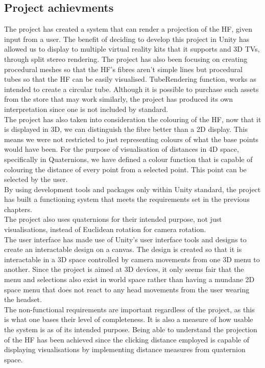 \documentclass[12pt]{article} %
\begin{document}
\begin{flushleft}
\subsection{Project achievments} %
The project has created a system that can render a projection of the HF, given input from a user. The benefit of deciding to develop this project in Unity has allowed us to display to multiple virtual reality kits that it supports \cite{unity:manualvr} and 3D TVs, through split stereo rendering. The project has also been focusing on creating procedural meshes so that the HF's fibres aren't simple lines but procedural tubes so that the HF can be easily visualised.
TubeRendering function, works as intended to create a circular tube. Although it is possible to purchase such assets from the store that may work similarly, the project has produced its own interpretation since one is not included by standard.\\
The project has also taken into consideration the colouring of the HF, now that it is displayed in 3D, we can distinguish the fibre better than a 2D display. This means we were not restricted to just representing colours of what the base points would have been. For the purpose of visualisation of distances in 4D space, specifically in Quaternions, we have defined a colour function that is capable of colouring the distance of every point from a selected point. This point can be selected by the user.\\
By using development tools and packages only within Unity standard, the project has built a functioning system that meets the requirements set in the previous chapters. \\
The project also uses quaternions for their intended purpose, not just visualisations, instead of Euclidean rotation for camera rotation.\\
The user interface has made use of Unity's user interface tools and designs to create an interactable design on a canvas. The design is created so that it is interactable in a 3D space controlled by camera movements from one 3D menu to another. Since the project is aimed at 3D devices, it only seems fair that the menu and selections also exist in world space rather than having a mundane 2D  space menu that does not react to any head movements from the user wearing the headset.\\
The non-functional requirements are important regardless of the project, as this is what one bases their level of completeness. It is also a measure of how usable the system is as of its intended purpose. Being able to understand the projection of the HF has been achieved since the clicking distance employed is capable of displaying visualisations by implementing distance measures from quaternion space.

\end{flushleft}
\end{document}
